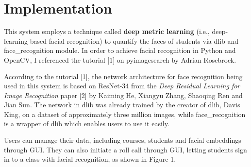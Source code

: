 \section{Implementation}
This system employs a technique called \textbf{deep metric learning} (i.e., deep-learning-based facial recognition)
to quantify the faces of students via dlib and face\_recognition module. In order to achieve facial
recognition in Python and OpenCV, I referenced the tutorial [1] on pyimagesearch by Adrian Rosebrock.
\newline

According to the tutorial [1], the network architecture for face recognition being used in this system
is based on ResNet-34 from the \textit {Deep Residual Learning for Image Recognition} paper [2] by Kaiming He,
Xiangyu Zhang, Shaoqing Ren and Jian Sun. The network in dlib was already trained by the creator of dlib,
Davis King, on a dataset of approximately three million images, while face\_recognition is a wrapper of
dlib which enables users to use it easily.
\newline

Users can manage their data, including courses, students and facial embeddings through GUI\@. They can also
initiate a roll call through GUI, letting students sign in to a class with facial recognition, as shown in
Figure 1.
\newline

